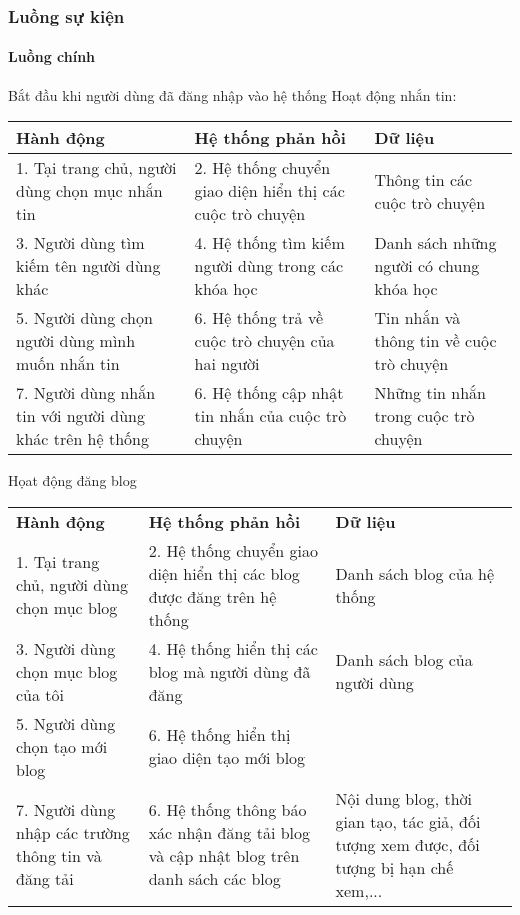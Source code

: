 \documentclass[./../main_file.tex]{subfiles}
\begin{document}
\subsubsection{Luồng sự kiện}
\paragraph{Luồng chính}
	Bắt đầu khi người dùng đã đăng nhập vào hệ thống
	Hoạt động nhắn tin:

\begin{table}[H]
				\begin{tabular}{|p{.33\textwidth}|p{}|p{}|}
		\hline
		\textbf{Hành động}                             & \textbf{Hệ thống phản hồi}                                & \textbf{Dữ liệu}                       \\ \hline
		1. Tại trang chủ, người dùng chọn mục nhắn tin & 2. Hệ thống chuyển giao diện hiển thị các cuộc trò chuyện & Thông tin các cuộc trò chuyện          \\ \hline
		3. Người dùng tìm kiếm tên người dùng khác     & 4. Hệ thống tìm kiếm người dùng trong các khóa học         & Danh sách những người có chung khóa học \\ \hline
		5. Người dùng chọn người dùng mình muốn nhắn tin         & 6. Hệ thống trả về cuộc trò chuyện của hai người  & Tin nhắn và thông tin về cuộc trò chuyện \\ \hline
		7. Người dùng nhắn tin với người dùng khác trên hệ thống & 6. Hệ thống cập nhật tin nhắn của cuộc trò chuyện & Những tin nhắn trong cuộc trò chuyện     \\ \hline
	\end{tabular}
\end{table}
Họat động đăng blog
\begin{table}[H]
	\begin{tabular}{|p{}|p{}|p{}|}
		\hline
		\textbf{Hành động} & \textbf{Hệ thống phản hồi} & \textbf{Dữ liệu} \\
		1. Tại trang chủ, người dùng chọn mục blog & 2. Hệ thống chuyển giao diện hiển thị các blog được đăng trên hệ thống & Danh sách blog của hệ thống \\ \hline
		3. Người dùng chọn mục blog của tôi & 4. Hệ thống hiển thị các blog mà người dùng đã đăng & Danh sách blog của người dùng \\ \hline
		5. Người dùng chọn tạo mới blog & 6. Hệ thống hiển thị giao diện tạo mới blog &  \\ \hline
	7. Người dùng nhập các trường thông tin và đăng tải & 6. Hệ thống thông báo xác nhận đăng tải blog và cập nhật blog trên danh sách các blog & Nội dung blog, thời gian tạo, tác giả, đối tượng xem được, đối tượng bị hạn chế xem,... \\ \hline

\end{tabular}
\end{table}
\end{document}
